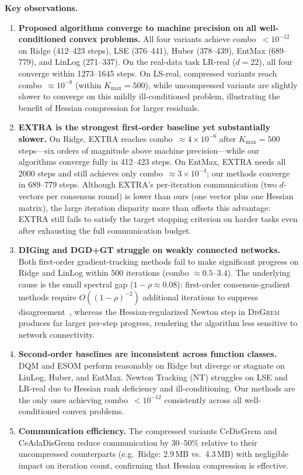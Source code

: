 \documentclass[11pt,a4paper]{article}
\def\cO{O}%
\newcommand{\cO}{\mathcal{O}}
\begin{document}
	\noindent\textbf{Key observations.}
	\begin{enumerate}[leftmargin=1.4em,itemsep=2pt]
		\item \textbf{Proposed algorithms converge to machine precision on all well-conditioned convex problems.}
		All four variants achieve combo~$<10^{-12}$ on Ridge (412--423 steps),
		LSE (376--441), Huber (378--439), EntMax (689--779), and LinLog (271--337).
		On the real-data task LR-real ($d=22$), all four converge within 1273--1645 steps.
		On LS-real, compressed variants reach combo~$\approx10^{-8}$ (within $K_{\max}=500$),
		while uncompressed variants are slightly slower to converge on this mildly ill-conditioned
		problem, illustrating the benefit of Hessian compression for larger residuals.
		
		\item \textbf{EXTRA is the strongest first-order baseline yet substantially slower.}
		On Ridge, EXTRA reaches combo~$\approx 4\times10^{-6}$ after $K_{\max}=500$ steps---six
		orders of magnitude above machine precision---while our algorithms converge fully in 412--423 steps.
		On EntMax, EXTRA needs all 2000 steps and still achieves only combo~$\approx 3\times10^{-4}$;
		our methods converge in 689--779 steps.
		Although EXTRA's per-iteration communication (two $d$-vectors per consensus round) is
		lower than ours (one vector plus one Hessian matrix), the large iteration disparity
		more than offsets this advantage: EXTRA still fails to satisfy the target stopping criterion
		on harder tasks even after exhausting the full communication budget.
		
		\item \textbf{DIGing and DGD+GT struggle on weakly connected networks.}
		Both first-order gradient-tracking methods fail to make significant progress on Ridge and LinLog
		within 500 iterations (combo $\approx 0.5$--$3.4$).
		The underlying cause is the small spectral gap ($1-\rho\approx0.08$):
		first-order consensus-gradient methods require $\cO((1-\rho)^{-2})$ additional iterations
		to suppress disagreement~\citep{nedic2009subgradient},
		whereas the Hessian-regularized Newton step in \textsc{DisGrem} produces far larger
		per-step progress, rendering the algorithm less sensitive to network connectivity.
		
		\item \textbf{Second-order baselines are inconsistent across function classes.}
		DQM and ESOM perform reasonably on Ridge but diverge or stagnate on LinLog, Huber, and EntMax.
		Newton Tracking (NT) struggles on LSE and LR-real due to Hessian rank deficiency
		and ill-conditioning.
		Our methods are the only ones achieving combo~$<10^{-12}$ consistently across all
		well-conditioned convex problems.
		
		\item \textbf{Communication efficiency.}
		The compressed variants CeDisGrem and CeAdaDisGrem reduce communication by
		$30$--$50\%$ relative to their uncompressed counterparts (e.g.\ Ridge: 2.9\,MB vs.\ 4.3\,MB)
		with negligible impact on iteration count, confirming that Hessian compression is effective.
	\end{enumerate}
\end{document}
